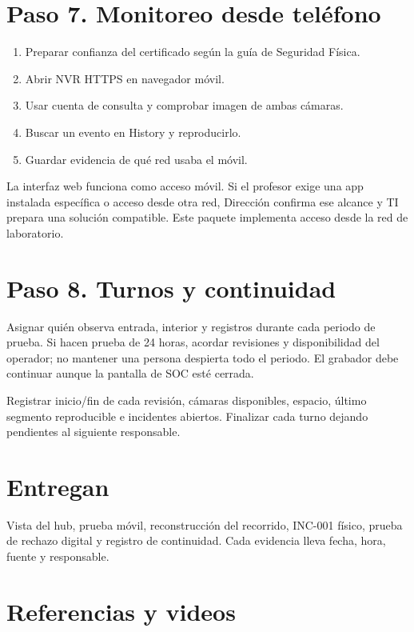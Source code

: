 \documentclass[12pt,a4paper]{article}
\begin{document}
\section*{Paso 7. Monitoreo desde teléfono}
\begin{enumerate}
\item Preparar confianza del certificado según la guía de Seguridad Física.
\item Abrir NVR HTTPS en navegador móvil.
\item Usar cuenta de consulta y comprobar imagen de ambas cámaras.
\item Buscar un evento en History y reproducirlo.
\item Guardar evidencia de qué red usaba el móvil.
\end{enumerate}
La interfaz web funciona como acceso móvil. Si el profesor exige una app instalada específica o acceso desde otra red, Dirección confirma ese alcance y TI prepara una solución compatible. Este paquete implementa acceso desde la red de laboratorio.\par
{}\section*{Paso 8. Turnos y continuidad}
Asignar quién observa entrada, interior y registros durante cada periodo de prueba. Si hacen prueba de 24 horas, acordar revisiones y disponibilidad del operador; no mantener una persona despierta todo el periodo. El grabador debe continuar aunque la pantalla de SOC esté cerrada.\par
Registrar inicio/fin de cada revisión, cámaras disponibles, espacio, último segmento reproducible e incidentes abiertos. Finalizar cada turno dejando pendientes al siguiente responsable.\par
{}\section*{Entregan}
Vista del hub, prueba móvil, reconstrucción del recorrido, INC-001 físico, prueba de rechazo digital y registro de continuidad. Cada evidencia lleva fecha, hora, fuente y responsable.\par
{}\section*{Referencias y videos}
\end{document}

